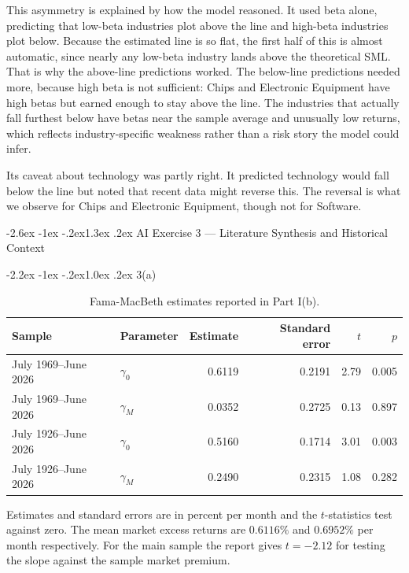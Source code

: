 \documentclass[11pt]{article}
\makeatletter
\renewcommand\section{\@startsection{section}{1}{0pt}%
  {-2.6ex \@plus -1ex \@minus -.2ex}{1.3ex \@plus .2ex}%
  {\normalfont\scshape\large\color{psink}}}   %
\renewcommand\subsection{\@startsection{subsection}{2}{0pt}%
  {-2.2ex \@plus -1ex \@minus -.2ex}{1.0ex \@plus .2ex}%
  {\normalfont\bfseries\normalsize\color{psink}}}
\makeatother
\begin{document}
This asymmetry is explained by how the model reasoned. It used beta alone,
predicting that low-beta industries plot above the line and high-beta
industries plot below. Because the estimated line is so flat, the first half of
this is almost automatic, since nearly any low-beta industry lands above the
theoretical SML. That is why the above-line predictions worked. The below-line
predictions needed more, because high beta is not sufficient: Chips and
Electronic Equipment have high betas but earned enough to stay above the line.
The industries that actually fall furthest below have betas near the sample
average and unusually low returns, which reflects industry-specific weakness
rather than a risk story the model could infer.

Its caveat about technology was partly right. It predicted technology would
fall below the line but noted that recent data might reverse this. The reversal
is what we observe for Chips and Electronic Equipment, though not for Software.


\section{AI Exercise 3 --- Literature Synthesis and Historical Context}

\subsection{3(a)}

\begin{table}[H]
\centering
\caption{Fama-MacBeth estimates reported in Part I(b).}
\small
\begin{tabular}{llrrrr}
\toprule
Sample & Parameter & Estimate & Standard error & $t$ & $p$ \\
\midrule
July 1969--June 2026 & $\gamma_0$ & 0.6119 & 0.2191 & 2.79 & 0.005 \\
July 1969--June 2026 & $\gamma_M$ & 0.0352 & 0.2725 & 0.13 & 0.897 \\
July 1926--June 2026 & $\gamma_0$ & 0.5160 & 0.1714 & 3.01 & 0.003 \\
July 1926--June 2026 & $\gamma_M$ & 0.2490 & 0.2315 & 1.08 & 0.282 \\
\bottomrule
\end{tabular}
\label{tab:ex3a}
\vspace{2pt}\begin{minipage}{0.93\textwidth}\footnotesize
Estimates and standard errors are in percent per month and the $t$-statistics test
against zero. The mean market excess returns are $0.6116\%$ and $0.6952\%$ per month
respectively. For the main sample the report gives $t = -2.12$ for testing the slope
against the sample market premium.
\end{minipage}
\end{table}
\end{document}
